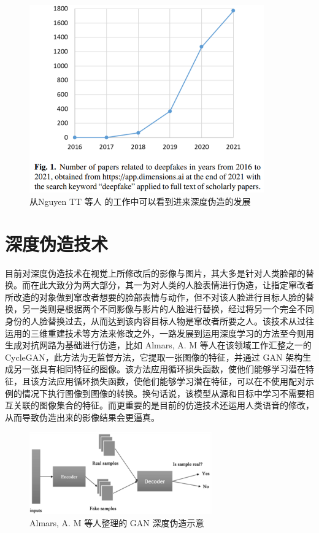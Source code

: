 \begin{figure}[htb]
\centering 
\includegraphics[width=0.90\textwidth]{img/ch1m0.png} 
\caption{从Nguyen TT 等人 \cite{nguyen2019deep} 的工作中可以看到进来深度伪造的发展}
\label{Test}
\end{figure}

\section{深度伪造技术}

目前对深度伪造技术在视觉上所修改后的影像与图片，其大多是针对人类脸部的替换。而在此大致分为两大部分，其一为对人类的人脸表情进行伪造，让指定窜改者所改造的对象做到窜改者想要的脸部表情与动作，但不对该人脸进行目标人脸的替换，另一类则是根据两个不同影像与影片的人脸进行替换，经过将另一个完全不同身份的人脸替换过去，从而达到该内容目标人物是窜改者所要之人。该技术从过往运用的三维重建技术等方法来修改之外，一路发展到运用深度学习的方法至今则用生成对抗网路为基础进行仿造，比如 Almars, A. M 等人在该领域工作汇整之一的 CycleGAN，此方法为无监督方法，它提取一张图像的特征，并通过 GAN 架构生成另一张具有相同特征的图像。该方法应用循环损失函数，使他们能够学习潜在特征，且该方法应用循环损失函数，使他们能够学习潜在特征，可以在不使用配对示例的情况下执行图像到图像的转换。换句话说，该模型从源和目标中学习不需要相互关联的图像集合的特征。而更重要的是目前的仿造技术还运用人类语音的修改，从而导致伪造出来的影像结果会更逼真。

\begin{figure}[htb]
\centering 
\includegraphics[width=0.70\textwidth]{img/ch1m2.png} 
\caption{Almars, A. M 等人整理的 GAN 深度伪造示意}
\label{Test}
\end{figure}

